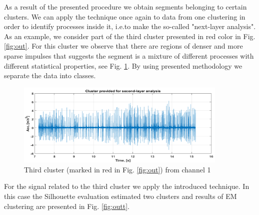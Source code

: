 \documentclass[10pt]{article}
\begin{document}
As a result of the presented procedure we obtain segments belonging to certain clusters. We can apply the technique once again to data from one clustering in order to identify processes inside it, i.e.to make the so-called  "next-layer analysis". As an example, we consider part of the third cluster presented in red color in Fig. \ref{fig:out}. For this cluster we observe that there are regions of denser and more sparse impulses that  suggests the segment is a mixture of different processes with different statistical properties, see Fig. \ref{fig:raw2}. By using presented methodology we separate the data into classes. 

\begin{figure}[h!]
\centering
\includegraphics[width=0.9\textwidth]{wykresy/raw2}
\caption{Third cluster (marked in red in Fig. \ref{fig:out}) from channel 1}
\label{fig:raw2}
\end{figure}

For the signal related to the third cluster we apply the introduced technique. In this case the Silhouette evaluation estimated two clusters and results of EM clustering are presented in Fig. \ref{fig:outt}.
\end{document}
